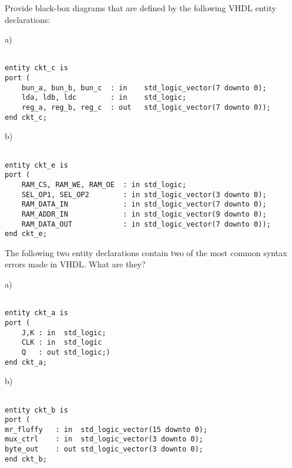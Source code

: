 \begin{my_num_list}
\item Provide black-box diagrams that are defined by the following VHDL entity declarations:

\noindent
\begin{minipage}{1\linewidth}
a)
\begin{lstlisting}[]

entity ckt_c is
port (
    bun_a, bun_b, bun_c  : in    std_logic_vector(7 downto 0);
    lda, ldb, ldc        : in    std_logic;
    reg_a, reg_b, reg_c  : out   std_logic_vector(7 downto 0));
end ckt_c;
\end{lstlisting}
\end{minipage}

\noindent
\begin{minipage}{1\linewidth}
b)
\begin{lstlisting}[]

entity ckt_e is
port ( 
    RAM_CS, RAM_WE, RAM_OE  : in std_logic;
    SEL_OP1, SEL_OP2        : in std_logic_vector(3 downto 0);
    RAM_DATA_IN             : in std_logic_vector(7 downto 0);
    RAM_ADDR_IN             : in std_logic_vector(9 downto 0);
    RAM_DATA_OUT            : in std_logic_vector(7 downto 0));
end ckt_e;
\end{lstlisting}
\end{minipage}

\item The following two entity declarations contain two of the most common syntax errors made in VHDL. What are they?

\noindent
\begin{minipage}{1\linewidth}
a)
\begin{lstlisting}[framexrightmargin=-180pt]

entity ckt_a is
port (
    J,K : in  std_logic;
    CLK : in  std_logic
    Q   : out std_logic;)
end ckt_a;
\end{lstlisting}
\end{minipage}

\noindent
\begin{minipage}{1\linewidth}
b)
\begin{lstlisting}[framexrightmargin=-80pt, mathescape=true]

entity ckt_b is
port (
mr_fluffy   : in  std_logic_vector(15 downto 0);
mux_ctrl    : in  std_logic_vector(3 downto 0);
byte_out    : out std_logic_vector(3 downto 0);
end ckt_b;
\end{lstlisting}
\end{minipage}
\end{my_num_list}


